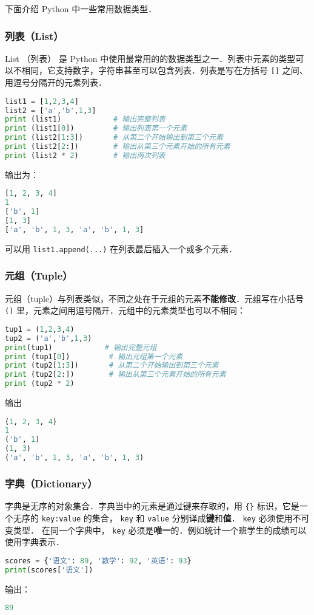 
下面介绍 Python 中一些常用数据类型．

\subsubsection{列表（List）}
List （列表） 是 Python 中使用最常用的的数据类型之一．列表中元素的类型可以不相同，它支持数字，字符串甚至可以包含列表．列表是写在方括号 \verb|[]| 之间、用逗号分隔开的元素列表．
\begin{lstlisting}[language=python]
list1 = [1,2,3,4]
list2 = ['a','b',1,3]
print (list1)            # 输出完整列表
print (list1[0])         # 输出列表第一个元素
print (list2[1:3])       # 从第二个开始输出到第三个元素
print (list2[2:])        # 输出从第三个元素开始的所有元素
print (list2 * 2)        # 输出两次列表
\end{lstlisting}
输出为：
\begin{lstlisting}[language=python]
[1, 2, 3, 4]
1
['b', 1]
[1, 3]
['a', 'b', 1, 3, 'a', 'b', 1, 3]
\end{lstlisting}
可以用 \verb|list1.append(...)| 在列表最后插入一个或多个元素．

\subsubsection{元组（Tuple）}
元组（tuple）与列表类似，不同之处在于元组的元素\textbf{不能修改}．元组写在小括号 \verb|()| 里，元素之间用逗号隔开．元组中的元素类型也可以不相同：
\begin{lstlisting}[language=python]
tup1 = (1,2,3,4)
tup2 = ('a','b',1,3)
print(tup1)            # 输出完整元组
print (tup1[0])         # 输出元组第一个元素
print (tup2[1:3])       # 从第二个开始输出到第三个元素
print (tup2[2:])        # 输出从第三个元素开始的所有元素
print (tup2 * 2)
\end{lstlisting}
输出
\begin{lstlisting}[language=python]
(1, 2, 3, 4)
1
('b', 1)
(1, 3)
('a', 'b', 1, 3, 'a', 'b', 1, 3)
\end{lstlisting}

\subsubsection{字典（Dictionary）}
字典是无序的对象集合．字典当中的元素是通过键来存取的，用 \verb|{}| 标识，它是一个无序的 \verb|key:value| 的集合， \verb|key| 和 \verb|value| 分别译成\textbf{键}和\textbf{值}． \verb|key| 必须使用不可变类型． 在同一个字典中， \verb|key| 必须是\textbf{唯一}的．例如统计一个班学生的成绩可以使用字典表示．
\begin{lstlisting}[language=python]
scores = {'语文': 89, '数学': 92, '英语': 93}
print(scores['语文'])
\end{lstlisting}
输出：
\begin{lstlisting}[language=python]
89
\end{lstlisting}
